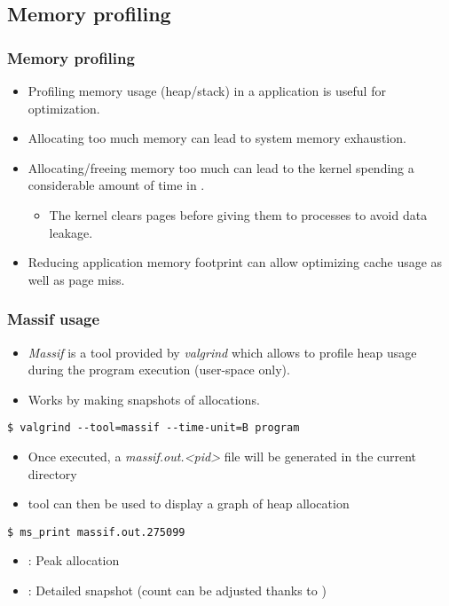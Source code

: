 \subsection{Memory profiling}

\begin{frame}
  \frametitle{Memory profiling}
  \begin{itemize}
    \item Profiling memory usage (heap/stack) in a application is useful for
          optimization.
    \item Allocating too much memory can lead to system memory exhaustion.
    \item Allocating/freeing memory too much can lead to the kernel spending a
          considerable amount of time in .
    \begin{itemize}
      \item The kernel clears pages before giving them to processes to
            avoid data leakage.
    \end{itemize}
    \item Reducing application memory footprint can allow optimizing cache usage
          as well as page miss.
  \end{itemize}
\end{frame}

\begin{frame}[fragile]
  \frametitle{Massif usage}
  \begin{itemize}
    \item {\em Massif} is a tool provided by {\em valgrind} which allows to profile
          heap usage during the program execution (user-space only).
    \item Works by making snapshots of allocations.
  \end{itemize}
  \begin{block}{}
    \begin{verbatim}
$ valgrind --tool=massif --time-unit=B program
    \end{verbatim}
  \end{block}
  \begin{itemize}
    \item Once executed, a {\em massif.out.<pid>} file will be generated in the
          current directory
    \item {} tool can then be used to display a graph of heap allocation
  \end{itemize}

  \begin{block}{}
    \begin{verbatim}
$ ms_print massif.out.275099
    \end{verbatim}
  \end{block}
  \begin{itemize}
    \item \code{#}: Peak allocation
    \item {}: Detailed snapshot (count can be adjusted thanks to
    )
  \end{itemize}
\end{frame}

